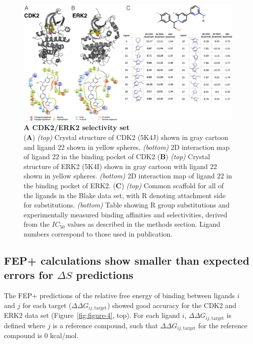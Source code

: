 \documentclass[phd,tocprelim]{cornell}
\begin{document}
\begin{landscape}
\begin{figure}[p]
\centering
\includegraphics[width=1.0\linewidth]{figures/figure3.png}
\caption[A CDK2/ERK2 selectivity set]{
{\bf A CDK2/ERK2 selectivity set}\\
({\bf A})  \emph{(top)} Crystal structure of CDK2 (5K4J) shown in gray cartoon and ligand 22 shown in yellow spheres. \emph{(bottom)} 2D interaction map of ligand 22 in the binding pocket of CDK2
({\bf B}) \emph{(top)} Crystal structure of ERK2 (5K4I) shown in gray cartoon with ligand 22 shown in yellow spheres. \emph{(bottom)} 2D interaction map of ligand 22 in the binding pocket of ERK2.
({\bf C}) \emph{(top)} Common scaffold for all of the ligands in the Blake data set, with R denoting attachment side for substitutions. \emph{(bottom)} Table showing R group substitutions and experimentally measured binding affinities and selectivities, derived from the $IC_{50}$ values as described in the methods section. Ligand numbers correspond to those used in publication. 
}
\label{fig:figure-3}
\end{figure}
\end{landscape}

\subsection{FEP+ calculations show smaller than expected errors for $\Delta S$ predictions}
The FEP+ predictions of the relative free energy of binding between ligands $i$ and $j$ for each target ($\Delta \Delta G_{ij, \text{target}}$) showed good accuracy for the CDK2 and ERK2 data set (Figure~\ref{fig:figure-4}, top). For each ligand $i$, $\Delta \Delta G_{ij, \text{target}}$ is defined where $j$ is a reference compound, such that $\Delta \Delta G_{ij, \text{target}}$ for the reference compound is 0 kcal/mol. 
\end{document}
